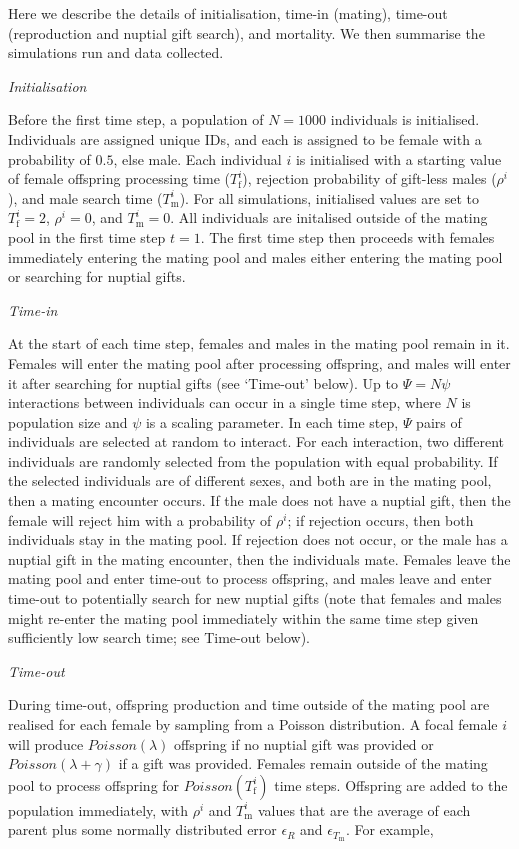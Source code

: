 \documentclass[
]{article}
\begin{document}
Here we describe the details of initialisation, time-in (mating),
time-out (reproduction and nuptial gift search), and mortality. We then
summarise the simulations run and data collected.

\emph{Initialisation}

Before the first time step, a population of \(N = 1000\) individuals is
initialised. Individuals are assigned unique IDs, and each is assigned
to be female with a probability of \(0.5\), else male. Each individual
\(i\) is initialised with a starting value of female offspring
processing time (\(T^{i}_{\mathrm{f}}\)), rejection probability of
gift-less males (\(\rho^{i}\)), and male search time
(\(T^{i}_{\mathrm{m}}\)). For all simulations, initialised values are
set to \(T^{i}_{\mathrm{f}} = 2\), \(\rho^{i} = 0\), and
\(T^{i}_{\mathrm{m}} = 0\). All individuals are initalised outside of
the mating pool in the first time step \(t = 1\). The first time step
then proceeds with females immediately entering the mating pool and
males either entering the mating pool or searching for nuptial gifts.

\emph{Time-in}

At the start of each time step, females and males in the mating pool
remain in it. Females will enter the mating pool after processing
offspring, and males will enter it after searching for nuptial gifts
(see `Time-out' below). Up to \(\Psi = N\psi\) interactions between
individuals can occur in a single time step, where \(N\) is population
size and \(\psi\) is a scaling parameter. In each time step, \(\Psi\)
pairs of individuals are selected at random to interact. For each
interaction, two different individuals are randomly selected from the
population with equal probability. If the selected individuals are of
different sexes, and both are in the mating pool, then a mating
encounter occurs. If the male does not have a nuptial gift, then the
female will reject him with a probability of \(\rho^{i}\); if rejection
occurs, then both individuals stay in the mating pool. If rejection does
not occur, or the male has a nuptial gift in the mating encounter, then
the individuals mate. Females leave the mating pool and enter time-out
to process offspring, and males leave and enter time-out to potentially
search for new nuptial gifts (note that females and males might re-enter
the mating pool immediately within the same time step given sufficiently
low search time; see Time-out below).

\emph{Time-out}

During time-out, offspring production and time outside of the mating
pool are realised for each female by sampling from a Poisson
distribution. A focal female \(i\) will produce \(Poisson(\lambda)\)
offspring if no nuptial gift was provided or
\(Poisson(\lambda + \gamma)\) if a gift was provided. Females remain
outside of the mating pool to process offspring for
\(Poisson(T^{i}_{\mathrm{f}})\) time steps. Offspring are added to the
population immediately, with \(\rho^{i}\) and \(T^{i}_{\mathrm{m}}\)
values that are the average of each parent plus some normally
distributed error \(\epsilon_{R}\) and \(\epsilon_{T_{\mathrm{m}}}\).
For example,
\end{document}

